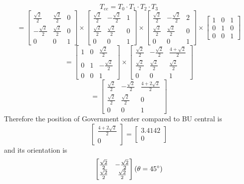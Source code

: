 \documentclass{article}
\begin{document}
\[
	T_{ee} = T_0 \cdot T_1 \cdot T_2 \cdot T_3
\]
\[
	=
	\begin{bmatrix}
		\frac{\sqrt{2}}{2}  & \frac{\sqrt{2}}{2} & 0 \\
		-\frac{\sqrt{2}}{2} & \frac{\sqrt{2}}{2} & 0 \\
		0                   & 0                  & 1
	\end{bmatrix}
	\times
	\begin{bmatrix}
		\frac{\sqrt{2}}{2} & -\frac{\sqrt{2}}{2} & 1 \\
		\frac{\sqrt{2}}{2} & \frac{\sqrt{2}}{2}  & 0 \\
		0                  & 0                   & 1
	\end{bmatrix}
	\times
	\begin{bmatrix}
		\frac{\sqrt{2}}{2} & -\frac{\sqrt{2}}{2} & 2 \\
		\frac{\sqrt{2}}{2} & \frac{\sqrt{2}}{2}  & 0 \\
		0                  & 0                   & 1
	\end{bmatrix}
	\times
	\begin{bmatrix}
		1 & 0 & 1 \\
		0 & 1 & 0 \\
		0 & 0 & 1
	\end{bmatrix}
\]
\[
	=
	\begin{bmatrix}
		1 & 0 & \frac{\sqrt{2}}{2}  \\
		0 & 1 & -\frac{\sqrt{2}}{2} \\
		0 & 0 & 1
	\end{bmatrix}
	\times
	\begin{bmatrix}
		\frac{\sqrt{2}}{2} & -\frac{\sqrt{2}}{2} & \frac{4+\sqrt{2}}{2} \\
		\frac{\sqrt{2}}{2} & \frac{\sqrt{2}}{2}  & \frac{\sqrt{2}}{2}   \\
		0                  & 0                   & 1
	\end{bmatrix}
\]
\[
	=
	\begin{bmatrix}
		\frac{\sqrt{2}}{2} & -\frac{\sqrt{2}}{2} & \frac{4+2\sqrt{2}}{2} \\
		\frac{\sqrt{2}}{2} & \frac{\sqrt{2}}{2}  & 0                     \\
		0                  & 0                   & 1
	\end{bmatrix}
\]
Therefore the position of Government center compared to BU central is
$$
	\begin{bmatrix}
		\frac{4+2\sqrt{2}}{2} \\
		0
	\end{bmatrix}
	=
	\begin{bmatrix}
		3.4142 \\
		0
	\end{bmatrix}
$$
and its orientation is
$$
	\begin{bmatrix}
		\frac{\sqrt{2}}{2} & -\frac{\sqrt{2}}{2} \\
		\frac{\sqrt{2}}{2} & \frac{\sqrt{2}}{2}
	\end{bmatrix}
	\space
	(\theta = 45^\circ)
$$
\end{document}
